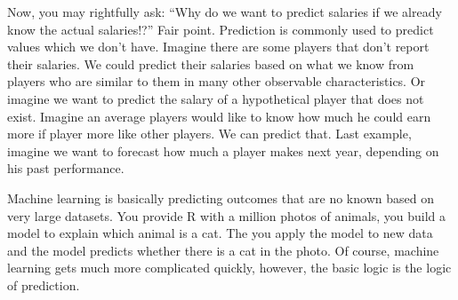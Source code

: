 \documentclass[
]{book}
\newenvironment{Shaded}{\begin{snugshade}}{\end{snugshade}}
\newcommand{\AttributeTok}[1]{\textcolor[rgb]{0.13,0.29,0.53}{#1}}
\newcommand{\CommentTok}[1]{\textcolor[rgb]{0.56,0.35,0.01}{\textit{#1}}}
\newcommand{\FunctionTok}[1]{\textcolor[rgb]{0.13,0.29,0.53}{\textbf{#1}}}
\newcommand{\NormalTok}[1]{#1}
\newcommand{\OtherTok}[1]{\textcolor[rgb]{0.56,0.35,0.01}{#1}}
\newcommand{\SpecialCharTok}[1]{\textcolor[rgb]{0.81,0.36,0.00}{\textbf{#1}}}
\newcommand{\StringTok}[1]{\textcolor[rgb]{0.31,0.60,0.02}{#1}}
\begin{document}
Now, you may rightfully ask: ``Why do we want to predict salaries if we already know the actual salaries!?'' Fair point. Prediction is commonly used to predict values which we don't have. Imagine there are some players that don't report their salaries. We could predict their salaries based on what we know from players who are similar to them in many other observable characteristics. Or imagine we want to predict the salary of a hypothetical player that does not exist. Imagine an average players would like to know how much he could earn more if player more like other players. We can predict that. Last example, imagine we want to forecast how much a player makes next year, depending on his past performance.

Machine learning is basically predicting outcomes that are no known based on very large datasets. You provide R with a million photos of animals, you build a model to explain which animal is a cat. The you apply the model to new data and the model predicts whether there is a cat in the photo. Of course, machine learning gets much more complicated quickly, however, the basic logic is the logic of prediction.

\begin{Shaded}
\end{Shaded}
\end{document}

